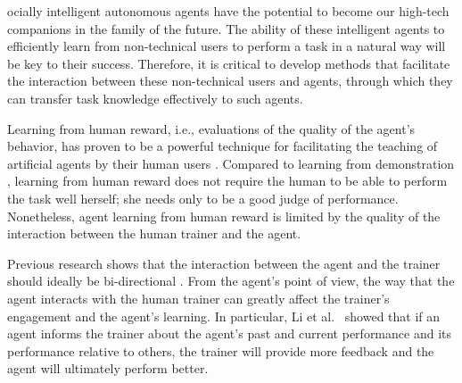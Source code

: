 \documentclass[10pt,journal,compsoc]{IEEEtran}
\begin{document}


ocially intelligent autonomous agents have the potential to become our high-tech companions in the family of the future. The ability of these intelligent agents to efficiently learn from non-technical users to perform a task in a natural way will be key to their success. Therefore, it is critical to develop methods that facilitate the interaction between these non-technical users and agents, through which they can transfer task knowledge effectively to such agents.

Learning from human reward, i.e., evaluations of the quality of the agent's behavior, has proven to be a powerful technique for facilitating the teaching of artificial agents by their human users \cite{isbell2001social,thomaz2008teachable,knox2009interactively}. Compared to learning from demonstration \cite{argall2009survey}, learning from human reward does not require the human to be able to perform the task well herself; she needs only to be a good judge of performance.  Nonetheless, agent learning from human reward is limited by the quality of the interaction between the human trainer and the agent. %

Previous research shows that the interaction between the agent and the trainer should ideally be bi-directional \cite{li2013using}. %
From the agent's point of view, the way that the agent interacts with the human trainer can greatly affect the trainer's engagement and the agent's learning. In particular, Li et al.\ \cite{li2013using,li2014learning} showed that if an agent informs the trainer about the agent's past and current performance and its performance relative to others, the trainer will provide more feedback and the agent will ultimately perform better. 
\end{document}
